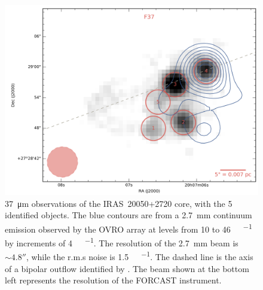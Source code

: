 \begin{figure}
\begin{center}
\includegraphics[width=\textwidth]{Figures/IRAS20050_core.png}
\caption{\SI{37}{\um} observations of the IRAS~20050+2720 core, with the 5 identified objects. The blue contours are from a \SI{2.7}{\milli\meter} continuum emission observed by the OVRO array \citep{Beltran:2008gu} at levels from 10 to \SI{46}{\milli\Jy\per\beam} by increments of \SI{4}{\milli\Jy\per\beam}. The resolution of the \SI{2.7}{\milli\meter} beam is $\sim\ang{;;4.8}$, while the r.m.s noise is \SI{1.5}{\milli\Jy\per\beam}. The dashed line is the axis of a bipolar outflow identified by \citet{Bachiller:1995cy}. The beam shown at the bottom left represents the resolution of the FORCAST instrument.}
\label{fig:IRAS20050_core}
\end{center}
\end{figure}


